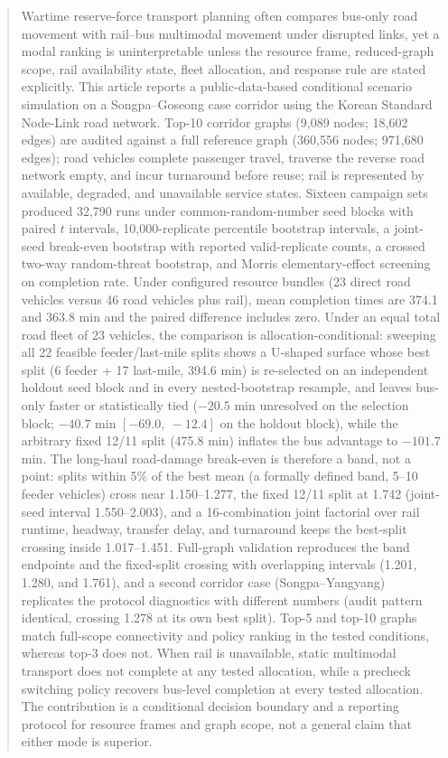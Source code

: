 \documentclass{ieeeaccess}
\begin{document}
\begin{abstract}
Wartime reserve-force transport planning often compares bus-only road movement with rail--bus multimodal movement under disrupted links, yet a modal ranking is uninterpretable unless the resource frame, reduced-graph scope, rail availability state, fleet allocation, and response rule are stated explicitly. This article reports a public-data-based conditional scenario simulation on a Songpa--Goseong case corridor using the Korean Standard Node-Link road network. Top-10 corridor graphs (9{,}089 nodes; 18{,}602 edges) are audited against a full reference graph (360{,}556 nodes; 971{,}680 edges); road vehicles complete passenger travel, traverse the reverse road network empty, and incur turnaround before reuse; rail is represented by available, degraded, and unavailable service states. Sixteen campaign sets produced 32{,}790 runs under common-random-number seed blocks with paired $t$ intervals, 10{,}000-replicate percentile bootstrap intervals, a joint-seed break-even bootstrap with reported valid-replicate counts, a crossed two-way random-threat bootstrap, and Morris elementary-effect screening on completion rate. Under configured resource bundles (23 direct road vehicles versus 46 road vehicles plus rail), mean completion times are 374.1 and 363.8 min and the paired difference includes zero. Under an equal total road fleet of 23 vehicles, the comparison is allocation-conditional: sweeping all 22 feasible feeder/last-mile splits shows a U-shaped surface whose best split (6 feeder + 17 last-mile, 394.6 min) is re-selected on an independent holdout seed block and in every nested-bootstrap resample, and leaves bus-only faster or statistically tied ($-20.5$ min unresolved on the selection block; $-40.7$ min $[-69.0,\ -12.4]$ on the holdout block), while the arbitrary fixed 12/11 split (475.8 min) inflates the bus advantage to $-101.7$ min. The long-haul road-damage break-even is therefore a band, not a point: splits within 5\% of the best mean (a formally defined band, 5--10 feeder vehicles) cross near 1.150--1.277, the fixed 12/11 split at 1.742 (joint-seed interval 1.550--2.003), and a 16-combination joint factorial over rail runtime, headway, transfer delay, and turnaround keeps the best-split crossing inside 1.017--1.451. Full-graph validation reproduces the band endpoints and the fixed-split crossing with overlapping intervals (1.201, 1.280, and 1.761), and a second corridor case (Songpa--Yangyang) replicates the protocol diagnostics with different numbers (audit pattern identical, crossing 1.278 at its own best split). Top-5 and top-10 graphs match full-scope connectivity and policy ranking in the tested conditions, whereas top-3 does not. When rail is unavailable, static multimodal transport does not complete at any tested allocation, while a precheck switching policy recovers bus-level completion at every tested allocation. The contribution is a conditional decision boundary and a reporting protocol for resource frames and graph scope, not a general claim that either mode is superior.
\end{abstract}
\end{document}
